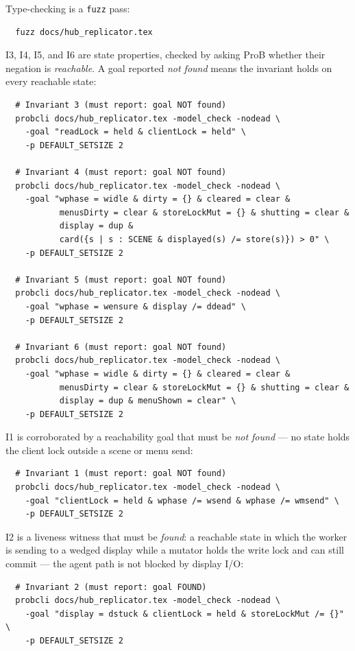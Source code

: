 \documentclass[a4paper,10pt,fleqn]{article}
\begin{document}
Type-checking is a \texttt{fuzz} pass:
\begin{verbatim}
  fuzz docs/hub_replicator.tex
\end{verbatim}

I3, I4, I5, and I6 are state properties, checked by asking ProB whether their
negation is \emph{reachable}.  A goal reported \emph{not found} means the
invariant holds on every reachable state:
\begin{verbatim}
  # Invariant 3 (must report: goal NOT found)
  probcli docs/hub_replicator.tex -model_check -nodead \
    -goal "readLock = held & clientLock = held" \
    -p DEFAULT_SETSIZE 2

  # Invariant 4 (must report: goal NOT found)
  probcli docs/hub_replicator.tex -model_check -nodead \
    -goal "wphase = widle & dirty = {} & cleared = clear &
           menusDirty = clear & storeLockMut = {} & shutting = clear &
           display = dup &
           card({s | s : SCENE & displayed(s) /= store(s)}) > 0" \
    -p DEFAULT_SETSIZE 2

  # Invariant 5 (must report: goal NOT found)
  probcli docs/hub_replicator.tex -model_check -nodead \
    -goal "wphase = wensure & display /= ddead" \
    -p DEFAULT_SETSIZE 2

  # Invariant 6 (must report: goal NOT found)
  probcli docs/hub_replicator.tex -model_check -nodead \
    -goal "wphase = widle & dirty = {} & cleared = clear &
           menusDirty = clear & storeLockMut = {} & shutting = clear &
           display = dup & menuShown = clear" \
    -p DEFAULT_SETSIZE 2
\end{verbatim}

I1 is corroborated by a reachability goal that must be \emph{not found} ---
no state holds the client lock outside a scene or menu send:
\begin{verbatim}
  # Invariant 1 (must report: goal NOT found)
  probcli docs/hub_replicator.tex -model_check -nodead \
    -goal "clientLock = held & wphase /= wsend & wphase /= wmsend" \
    -p DEFAULT_SETSIZE 2
\end{verbatim}

I2 is a liveness witness that must be \emph{found}: a reachable state in
which the worker is sending to a wedged display while a mutator holds the
write lock and can still commit --- the agent path is not blocked by
display I/O:
\begin{verbatim}
  # Invariant 2 (must report: goal FOUND)
  probcli docs/hub_replicator.tex -model_check -nodead \
    -goal "display = dstuck & clientLock = held & storeLockMut /= {}" \
    -p DEFAULT_SETSIZE 2
\end{verbatim}
\end{document}
